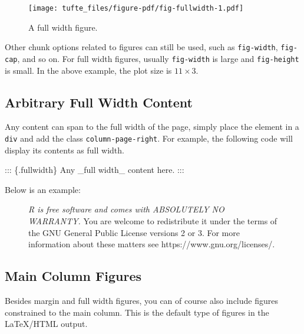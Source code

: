 \documentclass[
  letterpaper,
  DIV=11,
  numbers=noendperiod,
  oneside]{scrartcl}
\newenvironment{Shaded}{\begin{snugshade}}{\end{snugshade}}
\newcommand{\NormalTok}[1]{\textcolor[rgb]{0.00,0.23,0.31}{#1}}
\begin{document}
\begin{figure*}[H]

{\centering \texttt{[image: tufte\_files/figure-pdf/fig-fullwidth-1.pdf]}

}

\caption{\label{fig-fullwidth}A full width figure.}

\end{figure*}

Other chunk options related to figures can still be used, such as
\texttt{fig-width}, \texttt{fig-cap}, and so on. For full width figures,
usually \texttt{fig-width} is large and \texttt{fig-height} is small. In
the above example, the plot size is \(11 \times 3\).

\hypertarget{arbitrary-full-width-content}{%
\subsection{Arbitrary Full Width
Content}\label{arbitrary-full-width-content}}

Any content can span to the full width of the page, simply place the
element in a \texttt{div} and add the class \texttt{column-page-right}.
For example, the following code will display its contents as full width.

\begin{Shaded}
\begin{Highlighting}[]
\NormalTok{::: \{.fullwidth\}}
\NormalTok{Any \_full width\_ content here.}
\NormalTok{:::}
\end{Highlighting}
\end{Shaded}

Below is an example:

\begin{figure*}

\emph{R is free software and comes with ABSOLUTELY NO WARRANTY.} You are
welcome to redistribute it under the terms of the GNU General Public
License versions 2 or 3. For more information about these matters see
https://www.gnu.org/licenses/.

\end{figure*}

\hypertarget{main-column-figures}{%
\subsection{Main Column Figures}\label{main-column-figures}}

Besides margin and full width figures, you can of course also include
figures constrained to the main column. This is the default type of
figures in the LaTeX/HTML output.
\end{document}
